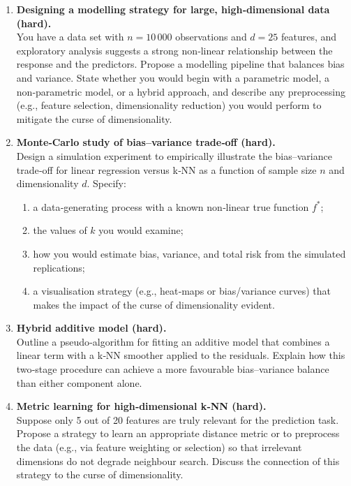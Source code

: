 \documentclass[12pt, a4paper]{article}
\begin{document}
\begin{enumerate}
\item \textbf{Designing a modelling strategy for large, high‑dimensional data (hard).}\\
You have a data set with \(n=10\,000\) observations and \(d=25\) features, and exploratory analysis suggests a strong non‑linear relationship between the response and the predictors.  Propose a modelling pipeline that balances bias and variance.  State whether you would begin with a parametric model, a non‑parametric model, or a hybrid approach, and describe any preprocessing (e.g., feature selection, dimensionality reduction) you would perform to mitigate the curse of dimensionality.

\item \textbf{Monte‑Carlo study of bias–variance trade‑off (hard).}\\
Design a simulation experiment to empirically illustrate the bias–variance trade‑off for linear regression versus k‑NN as a function of sample size \(n\) and dimensionality \(d\).  Specify:
\begin{enumerate}
    \item a data‑generating process with a known non‑linear true function \(f^{*}\);
    \item the values of \(k\) you would examine;
    \item how you would estimate bias, variance, and total risk from the simulated replications;
    \item a visualisation strategy (e.g., heat‑maps or bias/variance curves) that makes the impact of the curse of dimensionality evident.
\end{enumerate}

\item \textbf{Hybrid additive model (hard).}\\
Outline a pseudo‑algorithm for fitting an additive model that combines a linear term with a k‑NN smoother applied to the residuals.  Explain how this two‑stage procedure can achieve a more favourable bias–variance balance than either component alone.

\item \textbf{Metric learning for high‑dimensional k‑NN (hard).}\\
Suppose only 5 out of 20 features are truly relevant for the prediction task.  Propose a strategy to learn an appropriate distance metric or to preprocess the data (e.g., via feature weighting or selection) so that irrelevant dimensions do not degrade neighbour search.  Discuss the connection of this strategy to the curse of dimensionality.


\end{enumerate}
\end{document}
